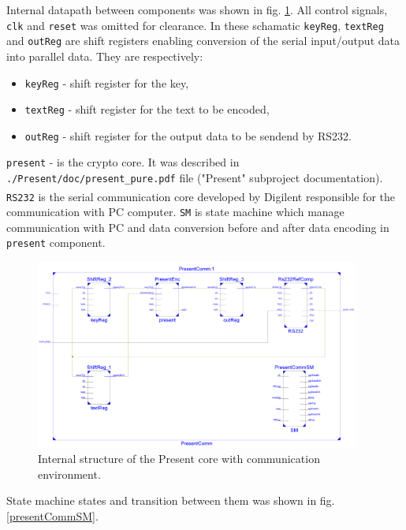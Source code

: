 \documentclass{gajewski}
\begin{document}
Internal datapath between components was shown in fig. \ref{pinside}. All control signals, \texttt{clk} and \texttt{reset} was omitted for clearance. In these schamatic \texttt{keyReg}, \texttt{textReg} and \texttt{outReg} are shift registers enabling conversion of the serial input/output data into parallel data. They are respectively:
\begin{itemize}
    \item \texttt{keyReg} - shift register for the key,
    \item \texttt{textReg} - shift register for the text to be encoded,
    \item \texttt{outReg} - shift register for the output data to be sendend by RS232.
\end{itemize}
\texttt{present} - is the crypto core. It was described in \texttt{./Present/doc/present\_pure.pdf} file ("Present" subproject documentation). \texttt{RS232} is the serial communication core developed by Digilent\textsuperscript{\textregistered} responsible for the communication with PC computer.
\texttt{SM} is state machine which manage communication with PC and data conversion before and after data encoding in \texttt{present} component.

\begin{figure}[!ht]%
    \begin{center}
    \includegraphics[width=0.95\textwidth]{img/PresentCommInside.png}
    \caption{%
        Internal structure of the Present core with communication environment. 
     }%
    \label{pinside}
    \end{center}
 \end{figure}

State machine states and transition between them was shown in fig. \ref{presentCommSM}.
\end{document}
